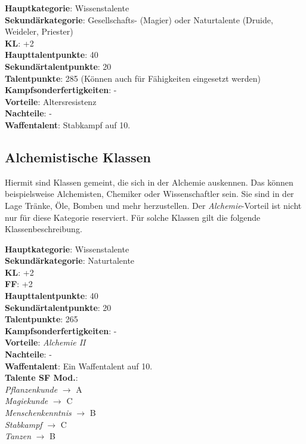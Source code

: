 \textbf{Hauptkategorie}: Wissenstalente \\
\textbf{Sekundärkategorie}: Gesellschafts- (Magier) oder Naturtalente (Druide, Weideler, Priester) \\
\textbf{KL}: +2 \\
\textbf{Haupttalentpunkte}: 40 \\
\textbf{Sekundärtalentpunkte}: 20 \\
\textbf{Talentpunkte}: 285 (Können auch für Fähigkeiten eingesetzt werden) \\
\textbf{Kampfsonderfertigkeiten}: - \\
\textbf{Vorteile}: Altersresistenz \\
\textbf{Nachteile}: - \\
\textbf{Waffentalent}: Stabkampf auf 10.

\subsection{Alchemistische Klassen}
Hiermit sind Klassen gemeint, die sich in der Alchemie auskennen. Das können beispielsweise Alchemisten, Chemiker oder Wissenschaftler sein. Sie sind in der Lage Tränke, Öle, Bomben und mehr herzustellen. Der \textit{Alchemie}-Vorteil ist nicht nur für diese Kategorie reserviert. Für solche Klassen gilt die folgende Klassenbeschreibung.

\textbf{Hauptkategorie}: Wissenstalente \\
\textbf{Sekundärkategorie}: Naturtalente \\
\textbf{KL}: +2 \\
\textbf{FF}: +2 \\
\textbf{Haupttalentpunkte}: 40 \\
\textbf{Sekundärtalentpunkte}: 20 \\
\textbf{Talentpunkte}: 265 \\
\textbf{Kampfsonderfertigkeiten}: - \\
\textbf{Vorteile}: \textit{Alchemie II} \\
\textbf{Nachteile}: - \\
\textbf{Waffentalent}: Ein Waffentalent auf 10.\\
\textbf{Talente SF Mod.}: \\
\textit{Pflanzenkunde} $\rightarrow$ A \\
\textit{Magiekunde} $\rightarrow$ C \\ 
\textit{Menschenkenntnis} $\rightarrow$ B \\
\textit{Stabkampf} $\rightarrow$ C \\
\textit{Tanzen} $\rightarrow$ B \\
~\\

